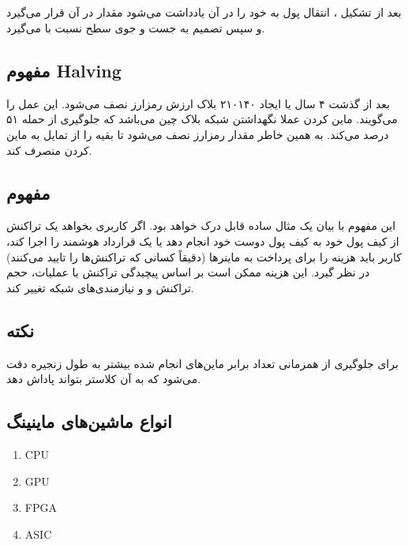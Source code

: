 \documentclass[10pt, a4paper]{article}
\begin{document}
\subsection{}

بعد از تشکیل ، انتقال پول به خود را در آن یادداشت می‌شود مقدار
 در آن قرار می‌گیرد و سپس تصمیم به جست و جوی سطح 
نسبت با  می‌گیرد.

\subsection{مفهوم Halving}

بعد از گذشت ۴ سال یا ایجاد ۲۱۰۱۴۰ بلاک ارزش رمزارز نصف می‌شود. این عمل را
 می‌گویند. ماین کردن عملا نگهداشتن شبکه بلاک چین می‌باشد که جلوگیری
از حمله ۵۱ درصد می‌کند. به همین خاطر مقدار رمزارز نصف می‌شود تا بقیه را از تمایل
به ماین کردن منصرف کند.

\subsection{مفهوم }

این مفهوم با بیان یک مثال ساده قابل درک خواهد بود. اگر کاربری بخواهد یک تراکنش
از کیف پول خود به کیف پول دوست خود انجام دهد یا یک قرارداد هوشمند را اجرا کند،
کاربر باید هزینه  را برای پرداخت به ماینر‌ها (دقیقاً کسانی که
تراکنش‌ها را تایید می‌کنند) در نظر گیرد. این هزینه ممکن است بر اساس پیچیدگی
تراکنش یا عملیات، حجم تراکنش و و نیازمندی‌های شبکه تغییر کند.

\subsection*{نکته}

برای جلوگیری از همزمانی تعداد برابر ماین‌های انجام شده بیشتر به طول زنجیره دقت
می‌شود که به آن کلاستر بتواند پاداش دهد.

\subsection*{انواع ماشین‌های ماینینگ}

\begin{enumerate}
    \item CPU
    \item GPU
    \item FPGA
    \item ASIC
\end{enumerate}
\end{document}
